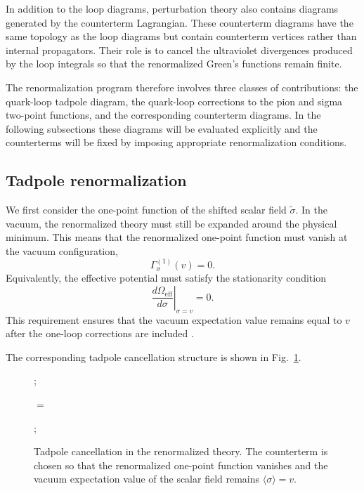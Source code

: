 In addition to the loop diagrams, perturbation theory also contains
diagrams generated by the counterterm Lagrangian. 
These counterterm diagrams have the same
topology as the loop diagrams but contain counterterm vertices rather
than internal propagators. Their role is to cancel the ultraviolet
divergences produced by the loop integrals so that the renormalized
Green's functions remain finite.

The renormalization program therefore involves three classes of
contributions: the quark-loop tadpole diagram, the quark-loop
corrections to the pion and sigma two-point functions, and the
corresponding counterterm diagrams. In the following subsections these
diagrams will be evaluated explicitly and the counterterms will be
fixed by imposing appropriate renormalization conditions.

\subsection*{Tadpole renormalization}

We first consider the one-point function of the shifted scalar field
\(\tilde{\sigma}\). In the vacuum, the renormalized theory must still
be expanded around the physical minimum. This means that the
renormalized one-point function must vanish at the vacuum
configuration,
\begin{equation}
\Gamma^{(1)}_{\sigma}(v)=0 .
\label{eq:qm_tadpole_condition}
\end{equation}
Equivalently, the effective potential must satisfy the stationarity
condition
\begin{equation}
\left.
\frac{d\Omega_{\mathrm{eff}}}{d\sigma}
\right|_{\sigma=v}
=0 .
\label{eq:qm_stationarity_condition}
\end{equation}
This requirement ensures that the vacuum expectation value remains
equal to \(v\) after the one-loop corrections are included
\cite{Folkestad2018,Andersen2024}.

The corresponding tadpole cancellation structure is shown in
Fig.~\ref{fig:qm_tadpole_cancellation}.

\begin{figure}[htbp]
\centering
\begin{minipage}{0.4\textwidth}
\raggedleft
{};
\end{minipage}
\begin{minipage}{0.1\textwidth}
\centering
\(
=
\)
\end{minipage}
\begin{minipage}{0.4\textwidth}
\raggedright
{};
\end{minipage}
\caption{Tadpole cancellation in the renormalized theory. The counterterm is chosen so that the renormalized one-point function vanishes and the vacuum expectation value of the scalar field remains \(\langle \sigma \rangle = v\).}
\label{fig:qm_tadpole_cancellation}
\end{figure}

